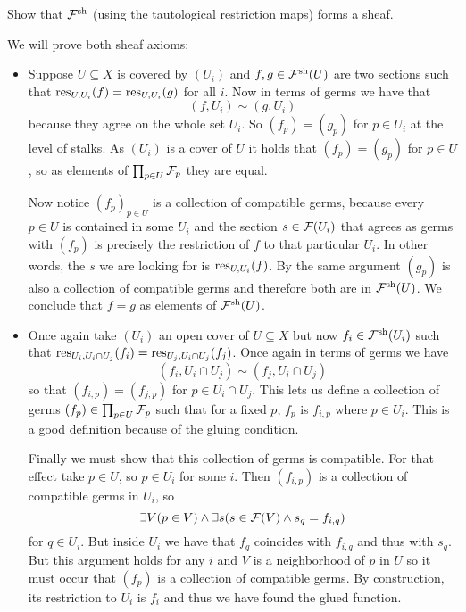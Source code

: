 \documentclass[12pt]{memoir}
\begin{document}

\begin{Ej}[2.4.H. Vakil]
    Show that $\mathcal{F}^{\text{sh}}$ (using the tautological restriction maps) forms a sheaf. 
\end{Ej}

\begin{ptcbr}
We will prove both sheaf axioms:
\begin{itemize}
    \itemsep=-0.4em
    \item Suppose $U\subseteq X$ is covered by $(U_i)$ and $f,g\in\mathcal{F}^{\text{sh}}(U)$ are two sections such that $\operatorname*{res}_{U,U_i}(f)=\operatorname*{res}_{U,U_i}(g)$ for all $i$. Now in terms of germs we have that 
    $$(f,U_i)\sim(g,U_i)$$
    because they agree on the whole set $U_i$. So $(f_p)=(g_p)$ for $p\in U_i$ at the level of stalks. As $(U_i)$ is a cover of $U$ it holds that $(f_p)=(g_p)$ for $p\in U$, so as elements of $\prod_{p\in U}\mathcal{F}_p$ they are equal.\par 
    Now notice $(f_p)_{p\in U}$ is a collection of compatible germs, because every $p\in U$ is contained in some $U_i$ and the section $s\in\mathcal{F}(U_i)$ that agrees as germs with $(f_p)$ is precisely the restriction of $f$ to that particular $U_i$. In other words, the $s$ we are looking for is $\operatorname*{res}_{U,U_i}(f)$. By the same argument $(g_p)$ is also a collection of compatible germs and therefore both are in $\mathcal{F}^{\text{sh}}(U)$. We conclude that $f=g$ as elements of $\mathcal{F}^{\text{sh}}(U)$.
    \item Once again take $(U_i)$ an open cover of $U\subseteq X$ but now $f_i\in\mathcal{F}^{\text{sh}}(U_i)$ such that $\operatorname*{res}_{U_i,U_i\cap U_j}(f_i)=\operatorname*{res}_{U_j,U_i\cap U_j}(f_j)$. Once again in terms of germs we have 
    $$(f_i,U_i\cap U_j)\sim(f_j,U_i\cap U_j)$$
    so that $(f_{i,p})=(f_{j,p})$ for $p\in U_i\cap U_j$. This lets us define a collection of germs $(f_p)\in\prod_{p\in U}\mathcal{F}_p$ such that for a fixed $p$, $f_p$ is $f_{i,p}$ where $p\in U_i$. This is a good definition because of the gluing condition. \par 
    Finally we must show that this collection of germs is compatible. For that effect take $p\in U$, so $p\in U_i$ for some $i$. Then $(f_{i,p})$ is a collection of compatible germs in $U_i$, so 
    $$\exists V(p\in V)\land \exists s(s\in\mathcal{F}(V)\land s_q=f_{i,q})$$
    for $q\in U_i$. But inside $U_i$ we have that $f_q$ coincides with $f_{i,q}$ and thus with $s_q$. But this argument holds for any $i$ and $V$ is a neighborhood of $p$ in $U$ so it must occur that $(f_p)$ is a collection of compatible germs. By construction, its restriction to $U_i$ is $f_i$ and thus we have found the glued function.
\end{itemize}
\end{ptcbr}
\end{document}
